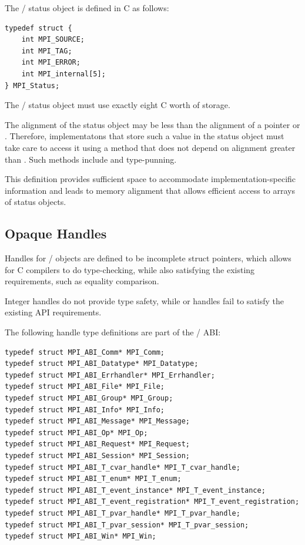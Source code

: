 The \MPI/ status object is defined in C as follows:
\begin{lstlisting}[language={[MPI]C}]
typedef struct {
    int MPI_SOURCE;
    int MPI_TAG;
    int MPI_ERROR;
    int MPI_internal[5];
} MPI_Status;
\end{lstlisting}
The \MPI/ status object must use exactly eight C  worth of storage.

\begin{implementors}
The alignment of the status object may be less than the alignment
of a pointer or .  Therefore, implementatons
that store such a value in the status object must take care to access
it using a method that does not depend on alignment greater than .
Such methods include  and type-punning.
\end{implementors}

\begin{rationale}
This definition provides sufficient space to accommodate implementation-specific 
information and leads to memory alignment that allows efficient access to arrays
of status objects.
\end{rationale}

\subsection{Opaque Handles}
\label{subsec:abi-opaque-handles}

Handles for \MPI/ objects are defined to be incomplete struct pointers, 
which allows for C compilers to do type-checking, while also satisfying 
the existing requirements, such as equality comparison.

\begin{rationale}
Integer handles do not provide type safety, while  or  handles 
fail to satisfy the existing API requirements.
\end{rationale}

The following handle type definitions are part of the \MPI/ ABI:

\begin{lstlisting}[language={[MPI]C}]
typedef struct MPI_ABI_Comm* MPI_Comm;
typedef struct MPI_ABI_Datatype* MPI_Datatype;
typedef struct MPI_ABI_Errhandler* MPI_Errhandler;
typedef struct MPI_ABI_File* MPI_File;
typedef struct MPI_ABI_Group* MPI_Group;
typedef struct MPI_ABI_Info* MPI_Info;
typedef struct MPI_ABI_Message* MPI_Message;
typedef struct MPI_ABI_Op* MPI_Op;
typedef struct MPI_ABI_Request* MPI_Request;
typedef struct MPI_ABI_Session* MPI_Session;
typedef struct MPI_ABI_T_cvar_handle* MPI_T_cvar_handle;
typedef struct MPI_ABI_T_enum* MPI_T_enum;
typedef struct MPI_ABI_T_event_instance* MPI_T_event_instance;
typedef struct MPI_ABI_T_event_registration* MPI_T_event_registration;
typedef struct MPI_ABI_T_pvar_handle* MPI_T_pvar_handle;
typedef struct MPI_ABI_T_pvar_session* MPI_T_pvar_session;
typedef struct MPI_ABI_Win* MPI_Win;
\end{lstlisting}

